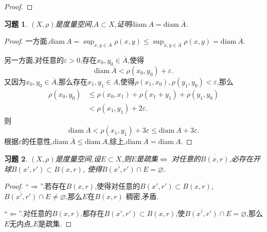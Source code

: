 \documentclass[a4paper,oneside,12pt]{ctexart}
\theoremstyle{plain}
\newtheorem{exercise}{习题}
\theoremstyle{nonumberplain}
\theoremstyle{nonumberplain}
\newtheorem{proof}{证明.}
\renewcommand{\epsilon}{\varepsilon}
\renewcommand{\emptyset}{\varnothing}
\newcommand{\diam}{\mathrm{diam\ }}
\begin{document}
\begin{proof}
    
\end{proof}

\begin{exercise}
    \label{ex:5}
    $(X,\rho)$是度量空间,$A\subset X$,证明$\diam A=\diam \overline{A}$.
\end{exercise}

\begin{proof}
    一方面,$\diam A=\sup_{x,y\in A}\rho(x,y)\leqslant \sup_{x,y\in\overline{A}}\rho(x,y)=\diam \overline{A}$.

    另一方面,对任意的$\epsilon>0$,存在$x_0,y_0\in\overline{A}$,使得
    \begin{equation*}
        \diam \overline{A}<\rho(x_0,y_0)+\epsilon.
    \end{equation*}
    又因为$x_0,y_0\in\overline{A}$,那么存在$x_1,y_1\in A$,使得$\rho(x_1,x_0),\rho(y_1,y_0)<\epsilon$,那么 
    \begin{align*}
        \rho(x_0,y_0)&\leqslant \rho(x_0,x_1)+\rho(x_1+y_1)+\rho(y_1,y_0)\\
        &<\rho(x_1,y_1)+2\epsilon.
    \end{align*}
    则 
    \begin{equation*}
        \diam \overline{A}<\rho(x_1,y_1)+3\epsilon\leqslant \diam A+3\epsilon.
    \end{equation*}
    根据$\epsilon$的任意性,$\diam\overline{A}\leqslant\diam A$,综上,$\diam\overline{A}=\diam A$.
\end{proof}

\begin{exercise}
    \label{ex:6}
    $(X,\rho)$是度量空间,设$E\subset X$,则$E$是疏集$\Leftrightarrow$ 对任意的$\overline{B(x,r)}$,必存在开球$B(x',r')\subset B(x,r)$,
    使得$\overline{B(x',r')}\cap E=\emptyset$.
\end{exercise}

\begin{proof}
    ``$\Rightarrow$''.若存在$B(x,r)$,使得对任意的$B(x',r')\subset B(x,r)$,$\overline{B(x',r')}\cap E\neq \emptyset$,那么$E$在$B(x,r)$
    稠密,矛盾.

    ``$\Leftarrow$''.对任意的$B(x,r)$,都存在$B(x',r')\subset B(x,r)$,使$\overline{B(x',r')}\cap E=\emptyset$,那么$E$无内点,$E$是疏集.
\end{proof}
\end{document}
